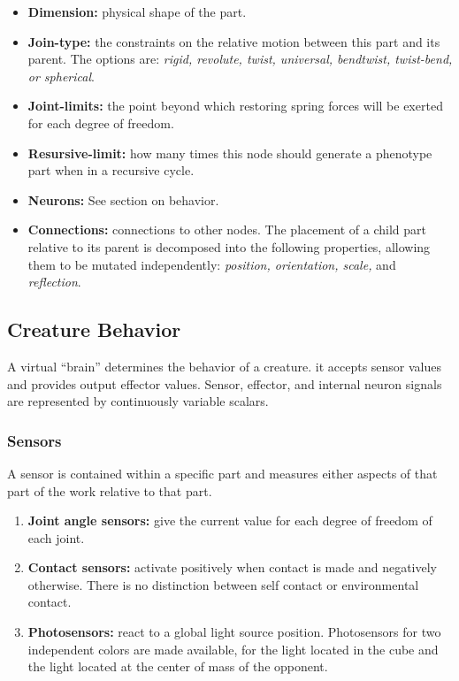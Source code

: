 \documentclass[../main.tex]{subfiles}
\begin{document}
\begin{itemize}
	\item \textbf{Dimension:} physical shape of the part.
	\item \textbf{Join-type:}  the constraints on the relative motion between this part and its parent. The options
	are: \emph{rigid, revolute, twist, universal, bendtwist, twist-bend, or spherical}.
	\item \textbf{Joint-limits:} the point beyond which restoring spring forces will be exerted for each degree of
	freedom.
	\item \textbf{Resursive-limit:}  how many times this node should generate a phenotype part when in a recursive
	cycle.
	\item \textbf{Neurons:} See section on behavior.
	\item \textbf{Connections:} connections to other nodes.  The placement of a child part relative to its parent is
	decomposed into the following properties, allowing them to be mutated independently: \emph{position, orientation,
	scale,} and \emph{reflection}.
\end{itemize}

\subsection{Creature Behavior}

A virtual ``brain'' determines the behavior of a creature. it accepts sensor values and provides output effector values. Sensor, effector, and internal neuron signals are represented by continuously variable scalars.

\subsubsection{Sensors}
A sensor is contained within a specific part and measures either aspects of that part of the work relative to that part.

\begin{enumerate}
	\item \textbf{Joint angle sensors:} give the current value for each degree of freedom of each joint.
	\item \textbf{Contact sensors:} activate positively when contact is made and negatively otherwise. There is no distinction between self contact or environmental contact.
	\item \textbf{Photosensors:}  react to a global light source position. Photosensors for two independent colors are
	made available, for the light located in the cube and the light located at the center of mass of the opponent.
\end{enumerate}
\end{document}
